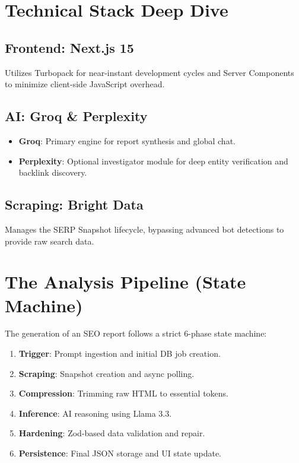 \documentclass[11pt,a4paper]{article}
\begin{document}
\section{Technical Stack Deep Dive}

\subsection{Frontend: Next.js 15}
Utilizes Turbopack for near-instant development cycles and Server Components to minimize client-side JavaScript overhead.

\subsection{AI: Groq & Perplexity}
\begin{itemize}
    \item \textbf{Groq}: Primary engine for report synthesis and global chat.
    \item \textbf{Perplexity}: Optional investigator module for deep entity verification and backlink discovery.
\end{itemize}

\subsection{Scraping: Bright Data}
Manages the SERP Snapshot lifecycle, bypassing advanced bot detections to provide raw search data.

\section{The Analysis Pipeline (State Machine)}
The generation of an SEO report follows a strict 6-phase state machine:
\begin{enumerate}
    \item \textbf{Trigger}: Prompt ingestion and initial DB job creation.
    \item \textbf{Scraping}: Snapshot creation and async polling.
    \item \textbf{Compression}: Trimming raw HTML to essential tokens.
    \item \textbf{Inference}: AI reasoning using Llama 3.3.
    \item \textbf{Hardening}: Zod-based data validation and repair.
    \item \textbf{Persistence}: Final JSON storage and UI state update.
\end{enumerate}
\end{document}
